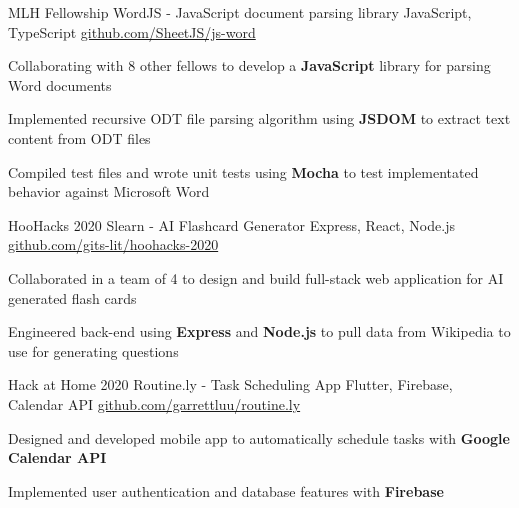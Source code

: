 \documentclass[]{awesome-cv}
\begin{document}
\vspace{-5mm}
\begin{cventries}

	\cventry
  {MLH Fellowship}
  {WordJS - JavaScript document parsing library}
  {JavaScript, TypeScript}
  {\href{https://github.com/SheetJS/js-word}{github.com/SheetJS/js-word}}
  {\begin{cvitems}
    \item {Collaborating with 8 other fellows to develop a \textbf{JavaScript} library
      for parsing Word documents}
    \item{Implemented recursive ODT file parsing algorithm using \textbf{JSDOM}
      to extract text content from ODT files}
    \item{Compiled test files and wrote unit tests using \textbf{Mocha} to test
      implementated behavior against Microsoft Word}
    \end{cvitems}}

  \vspace{-3mm}
	\cventry
  {HooHacks 2020}
  {Slearn - AI Flashcard Generator}
	{Express, React, Node.js}
	{\href{https://github.com/gits-lit/hoohacks-2020}{github.com/gits-lit/hoohacks-2020}}
  {\begin{cvitems}
    \item{Collaborated in a team of 4 to design and build full-stack web
      application for AI generated flash cards}
    \item{Engineered back-end using \textbf{Express} and \textbf{Node.js} to
      pull data from Wikipedia to use for generating questions}
    \end{cvitems}}

  \vspace{-3mm}
	\cventry
  {Hack at Home 2020}
  {Routine.ly - Task Scheduling App}
	{Flutter, Firebase, Calendar API}
	{\href{https://github.com/garrettluu/routine.ly}{github.com/garrettluu/routine.ly}}
  {\begin{cvitems}
    \item{Designed and developed mobile app to automatically schedule tasks with
      \textbf{Google Calendar API}}
    \item{Implemented user authentication and database features with
      \textbf{Firebase}}
  \end{cvitems}}

\end{cventries}

\end{document}
